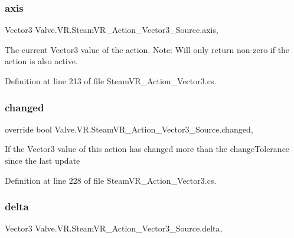 \subsubsection{\texorpdfstring{axis}{axis}}
{\footnotesize\ttfamily Vector3 Valve.\+V\+R.\+Steam\+V\+R\+\_\+\+Action\+\_\+\+Vector3\+\_\+\+Source.\+axis\hspace{0.3cm}{\ttfamily [get]}, {}}



The current Vector3 value of the action. Note\+: Will only return non-\/zero if the action is also active. 



Definition at line 213 of file Steam\+V\+R\+\_\+\+Action\+\_\+\+Vector3.\+cs.

\mbox{\label{class_valve_1_1_v_r_1_1_steam_v_r___action___vector3___source_ac9a707e227aad74ebdebb5bc7c9d48b9}} 
\subsubsection{\texorpdfstring{changed}{changed}}
{\footnotesize\ttfamily override bool Valve.\+V\+R.\+Steam\+V\+R\+\_\+\+Action\+\_\+\+Vector3\+\_\+\+Source.\+changed\hspace{0.3cm}{\ttfamily [get]}, {}}



If the Vector3 value of this action has changed more than the change\+Tolerance since the last update 



Definition at line 228 of file Steam\+V\+R\+\_\+\+Action\+\_\+\+Vector3.\+cs.

\mbox{\label{class_valve_1_1_v_r_1_1_steam_v_r___action___vector3___source_a873631911364f757a5d24f079d190e44}} 
\subsubsection{\texorpdfstring{delta}{delta}}
{\footnotesize\ttfamily Vector3 Valve.\+V\+R.\+Steam\+V\+R\+\_\+\+Action\+\_\+\+Vector3\+\_\+\+Source.\+delta\hspace{0.3cm}{\ttfamily [get]}, {}}



